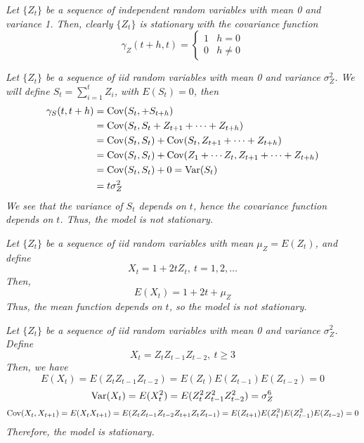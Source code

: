 \begin{example}
    \emph{
        Let $\{Z_t\}$ be a sequence of independent random variables with mean 0 and variance 1. Then, clearly $\{Z_t\}$ is stationary with the covariance function 
        \[\gamma_Z(t+h, t) = \begin{cases}
            1 & h = 0\\
            0 & h \neq 0
        \end{cases}\]
    }
\end{example}
\begin{example}
    \emph{
        Let $\{Z_t\}$ be a sequence of iid random variables with mean 0 and variance $\sigma_Z^2$. We will define $S_t = \sum_{i=1}^t Z_i$, with $E(S_t) = 0$, then 
        }
        \begin{align*}
            \gamma_S(t,t+h) &= \operatorname{Cov}(S_t, + S_{t+h}) \\
            &= \operatorname{Cov}(S_t, S_t + Z_{t+1} + \cdots + Z_{t+h}) \\
            &= \operatorname{Cov}(S_t,S_t) + \operatorname{Cov}(S_t, Z_{t+1} + \cdots + Z_{t+h}) \\
            &= \operatorname{Cov}(S_t,S_t) + \operatorname{Cov}(Z_1 + \cdots Z_t, Z_{t+1} + \cdots + Z_{t+h}) \\
            &= \operatorname{Cov}(S_t, S_t) + 0 = \operatorname{Var}(S_t)\\
            &= t\sigma_Z^2
        \end{align*}
        \emph{
            We see that the variance of $S_t$ depends on $t$, hence the covariance function depends on $t$. Thus, the model is not stationary.
        }
\end{example}

\begin{example}
    \emph{
        Let $\{Z_t\}$ be a sequence of iid random variables with mean $\mu_Z = E(Z_t)$, and define 
        \[X_t = 1 + 2t Z_t, \ t = 1,2,\ldots\]
        Then,
        \[E(X_t) = 1 + 2t + \mu_Z\]
        Thus, the mean function depends on $t$, so the model is not stationary.
    }
\end{example}

\begin{example}
    \emph{
        Let $\{Z_t\}$ be a sequence of iid random variables with mean 0 and variance $\sigma_Z^2$. Define 
        \[X_t = Z_tZ_{t-1}Z_{t-2}, \ t \geq 3\]
        Then, we have 
        \[E(X_t) = E(Z_tZ_{t-1}Z_{t-2}) = E(Z_t)E(Z_{t-1})E(Z_{t-2}) = 0\]
        \[\operatorname{Var}(X_t) = E(X_t^2) = E(Z_t^2Z_{t-1}^2Z_{t-2}^2) = \sigma_Z^6\]
        \[\operatorname{Cov}(X_t,X_{t+1}) = E(X_tX_{t+1}) = E({Z_tZ_{t-1}Z_{t-2}}{Z_{t+1}Z_tZ_{t-1}}) = E(Z_{t+1})E(Z_t^2)E(Z_{t-1}^2)E(Z_{t-2}) = 0\]
        Therefore, the model is stationary.
        }    
\end{example}

